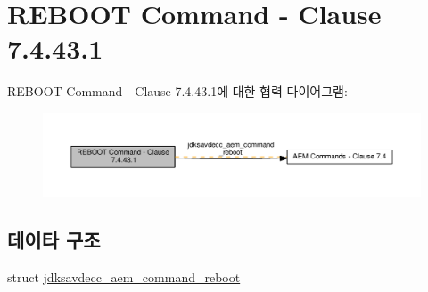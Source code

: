 \hypertarget{group__command__reboot}{}\section{R\+E\+B\+O\+OT Command -\/ Clause 7.4.43.1}
\label{group__command__reboot}
R\+E\+B\+O\+OT Command -\/ Clause 7.4.43.1에 대한 협력 다이어그램\+:
\nopagebreak
\begin{figure}[H]
\begin{center}
\leavevmode
\includegraphics[width=350pt]{group__command__reboot}
\end{center}
\end{figure}
\subsection*{데이타 구조}
\begin{DoxyCompactItemize}
\item 
struct \hyperlink{structjdksavdecc__aem__command__reboot}{jdksavdecc\+\_\+aem\+\_\+command\+\_\+reboot}
\end{DoxyCompactItemize}
